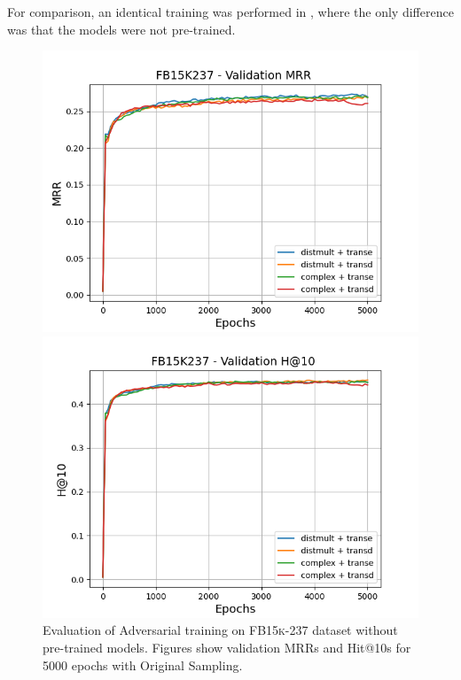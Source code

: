 For comparison, an identical training was performed in , where the only difference was that the models were not pre-trained.
\begin{figure}
    \centering
    \begin{minipage}{.5\textwidth}
      \centering
      \includegraphics[width=0.9\linewidth]{figures/results/gan_train/not_pretrained/random/fb15k237/epochs5000/gan_train_random_fb15k237_mrrs.png}
    \end{minipage}%
    \begin{minipage}{.5\textwidth}
      \centering
      \includegraphics[width=0.9\linewidth]{figures/results/gan_train/not_pretrained/random/fb15k237/epochs5000/gan_train_random_fb15k237_hit10s.png}
    \end{minipage}
    \caption{Evaluation of Adversarial training on \textsc{FB15k-237} dataset without pre-trained models.
    Figures show validation MRRs and Hit@10s for 5000 epochs with Original Sampling.}
    \label{fig:original_not_pretrained_advtrain}
\end{figure}
